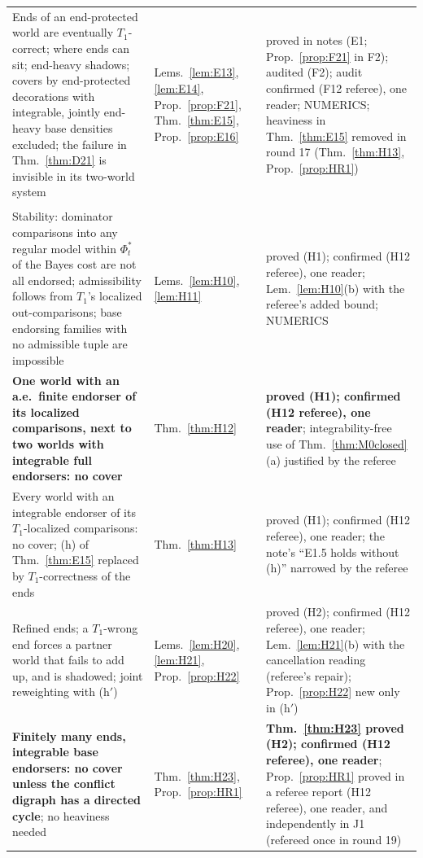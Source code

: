 \documentclass[11pt]{article}
\theoremstyle{definition}
\theoremstyle{remark}
\begin{document}
{\begin{longtable}{>{\raggedright\arraybackslash}p{6.4cm}>{\raggedright\arraybackslash}p{2.1cm}>{\raggedright\arraybackslash}p{5.6cm}}
Ends of an end-protected world are eventually $T_1$-correct; where ends can sit; end-heavy shadows; covers by end-protected decorations with integrable, jointly end-heavy base densities excluded; the failure in Thm.~\ref{thm:D21} is invisible in its two-world system & Lems.~\ref{lem:E13}, \ref{lem:E14}, Prop.~\ref{prop:F21}, Thm.~\ref{thm:E15}, Prop.~\ref{prop:E16} & proved in notes (E1; Prop.~\ref{prop:F21} in F2); audited (F2); audit confirmed (F12 referee), one reader; NUMERICS; heaviness in Thm.~\ref{thm:E15} removed in round 17 (Thm.~\ref{thm:H13}, Prop.~\ref{prop:HR1})\\
\multicolumn{3}{l}{\emph{Round 17} (\S\ref{sec:open-core}(f$'$), (g); notes H1, H2, J1; referees H12, J1 (round 19))}\\
Stability: dominator comparisons into any regular model within $\Phi^*_t$ of the Bayes cost are not all endorsed; admissibility follows from $T_1$'s localized out-comparisons; base endorsing families with no admissible tuple are impossible & Lems.~\ref{lem:H10}, \ref{lem:H11} & proved (H1); confirmed (H12 referee), one reader; Lem.~\ref{lem:H10}(b) with the referee's added bound; NUMERICS\\
\textbf{One world with an a.e.\ finite endorser of its localized comparisons, next to two worlds with integrable full endorsers: no cover} & Thm.~\ref{thm:H12} & \textbf{proved (H1); confirmed (H12 referee), one reader}; integrability-free use of Thm.~\ref{thm:M0closed}(a) justified by the referee\\
Every world with an integrable endorser of its $T_1$-localized comparisons: no cover; (h) of Thm.~\ref{thm:E15} replaced by $T_1$-correctness of the ends & Thm.~\ref{thm:H13} & proved (H1); confirmed (H12 referee), one reader; the note's ``E1.5 holds without (h)'' narrowed by the referee\\
Refined ends; a $T_1$-wrong end forces a partner world that fails to add up, and is shadowed; joint reweighting with (h$'$) & Lems.~\ref{lem:H20}, \ref{lem:H21}, Prop.~\ref{prop:H22} & proved (H2); confirmed (H12 referee), one reader; Lem.~\ref{lem:H21}(b) with the cancellation reading (referee's repair); Prop.~\ref{prop:H22} new only in (h$'$)\\
\textbf{Finitely many ends, integrable base endorsers: no cover unless the conflict digraph has a directed cycle}; no heaviness needed & Thm.~\ref{thm:H23}, Prop.~\ref{prop:HR1} & \textbf{Thm.~\ref{thm:H23} proved (H2); confirmed (H12 referee), one reader}; Prop.~\ref{prop:HR1} proved in a referee report (H12 referee), one reader, and independently in J1 (refereed once in round 19)\\

\end{longtable}}
\end{document}
